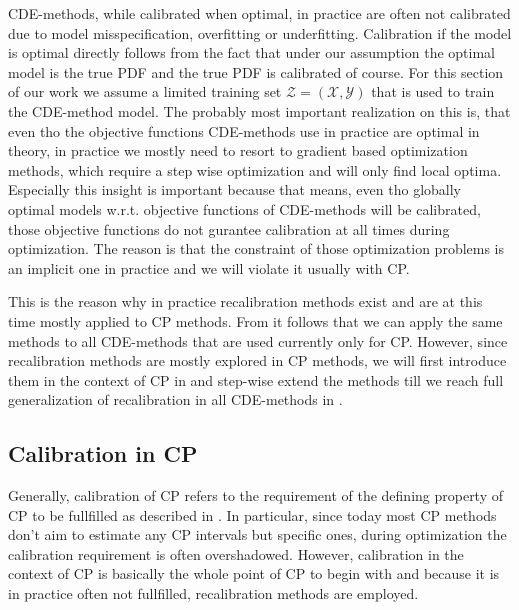 CDE-methods, while calibrated when optimal, in practice are often not calibrated due to model misspecification, overfitting or underfitting. Calibration if the model is optimal directly follows from the fact that under our assumption the optimal model is the true PDF and the true PDF is calibrated of course. For this section of our work we assume a limited training set $\mathcal{Z} = (\mathcal{X}, \mathcal{Y})$ that is used to train the CDE-method model. The probably most important realization on this is, that even tho the objective functions CDE-methods use in practice are optimal in theory, in practice we mostly need to resort to gradient based optimization methods, which require a step wise optimization and will only find local optima. Especially this insight is important because that means, even tho globally optimal models w.r.t. objective functions of CDE-methods will be calibrated, those objective functions do not gurantee calibration at all times during optimization. The reason is that the constraint of those optimization problems is an implicit one in practice and we will violate it usually with CP.%

This is the reason why in practice recalibration methods exist and are at this time mostly applied to CP methods. From  it follows that we can apply the same methods to all CDE-methods that are used currently only for CP. However, since recalibration methods are mostly explored in CP methods, we will first introduce them in the context of CP in  and step-wise extend the methods till we reach full generalization of recalibration in all CDE-methods in .

\subsection{Calibration in CP}\label{sec:calibration_cp}
Generally, calibration of CP refers to the requirement of the defining property of CP to be fullfilled as described in . In particular, since today most CP methods don't aim to estimate any CP intervals but specific ones, during optimization the calibration requirement is often overshadowed. However, calibration in the context of CP is basically the whole point of CP to begin with and because it is in practice often not fullfilled, recalibration methods are employed.

